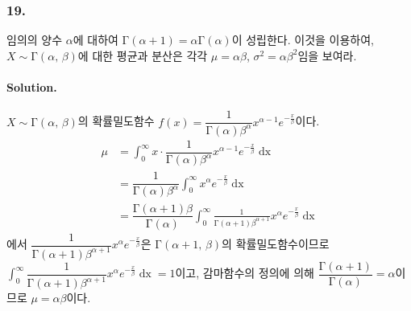 \subsubsection{19.} 임의의 양수 $\alpha$에 대하여 $\mathrm{\Gamma}\left(\alpha+1\right)=\alpha\mathrm{\Gamma}\left(\alpha\right)$이
성립한다. 이것을 이용하여, $X\sim\mathrm{\Gamma}\left(\alpha,\,\beta\right)$에 대한 평균과 분산은 각각 $\mu=\alpha\beta$, $\sigma^2=\alpha\beta^2$임을 보여라.

\paragraph{Solution.} $X\sim\mathrm{\Gamma}\left(\alpha,\,\beta\right)$의 확률밀도함수
$f\left(x\right) = \dfrac{1}{\mathrm{\Gamma}\left(\alpha\right)\beta^\alpha}x^{\alpha-1}e^{-\frac{x}{\beta}}$이다.
\begin{align*}
	\mu &= \int_0^\infty x \cdot \dfrac{1}{\mathrm{\Gamma}\left(\alpha\right)\beta^\alpha}x^{\alpha-1}e^{-\frac{x}{\beta}} \mathop{dx} \\
	&= \dfrac{1}{\mathrm{\Gamma}\left(\alpha\right)\beta^\alpha} \int_0^\infty x^{\alpha}e^{-\frac{x}{\beta}} \mathop{dx} \\
	&= \dfrac{\mathrm{\Gamma}\left(\alpha + 1\right)\beta}{\mathrm{\Gamma}\left(\alpha\right)} \int_0^\infty \frac{1}{\mathrm{\Gamma}\left(\alpha+1\right)\beta^{\alpha+1}} x^{\alpha}e^{-\frac{x}{\beta}} \mathop{dx}
\end{align*}
에서 $\dfrac{1}{\mathrm{\Gamma}\left(\alpha+1\right)\beta^{\alpha+1}} x^{\alpha}e^{-\frac{x}{\beta}}$은
$\mathrm{\Gamma}\left(\alpha + 1,\,\beta\right)$의 확률밀도함수이므로 $\displaystyle \int_0^\infty \dfrac{1}{\mathrm{\Gamma}\left(\alpha+1\right)\beta^{\alpha+1}} x^{\alpha}e^{-\frac{x}{\beta}} \mathop{dx} = 1$이고,
감마함수의 정의에 의해 $\dfrac{\mathrm{\Gamma}\left(\alpha + 1\right)}{\mathrm{\Gamma}\left(\alpha\right)} = \alpha$이므로 $\mu = \alpha\beta$이다.

